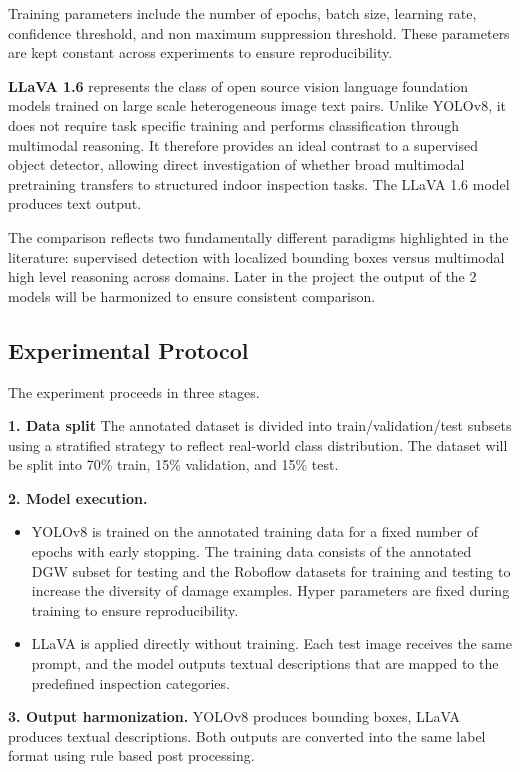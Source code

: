 Training parameters include the number of epochs, batch size, learning rate, confidence threshold, and non maximum suppression threshold. These parameters are kept constant across experiments to ensure reproducibility.

\textbf{LLaVA 1.6} represents the class of open source vision language foundation models trained on large scale heterogeneous image text pairs. Unlike YOLOv8, it does not require task specific training and performs classification through multimodal reasoning. It therefore provides an ideal contrast to a supervised object detector, allowing direct investigation of whether broad multimodal pretraining transfers to structured indoor inspection tasks. The LLaVA 1.6 model produces text output.

The comparison reflects two fundamentally different paradigms highlighted in the literature: supervised detection with localized bounding boxes versus multimodal high level reasoning across domains. Later in the project the output of the 2 models will be harmonized to ensure consistent comparison.

\subsection{Experimental Protocol}
The experiment proceeds in three stages.

\textbf{1. Data split}
The annotated dataset is divided into train/validation/test subsets using a stratified strategy to reflect real-world class distribution. The dataset will be split into 70\% train, 15\% validation, and 15\% test. 

\textbf{2. Model execution.}
\begin{itemize}
    \item YOLOv8 is trained on the annotated training data for a fixed number of epochs with early stopping. The training data consists of the annotated DGW subset for testing and the Roboflow datasets for training and testing to increase the diversity of damage examples. Hyper parameters are fixed during training to ensure reproducibility. 
    \item LLaVA is applied directly without training. Each test image receives the same prompt, and the model outputs textual descriptions that are mapped to the predefined inspection categories. 
\end{itemize}

\textbf{3. Output harmonization.}
YOLOv8 produces bounding boxes, LLaVA produces textual descriptions. Both outputs are converted into the same label format using rule based post processing. 

